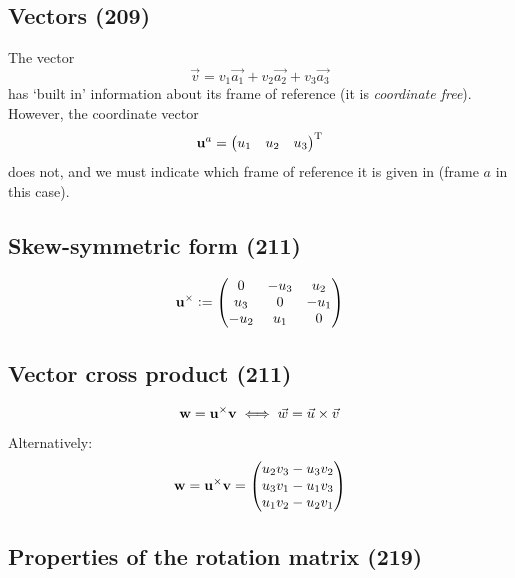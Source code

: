 \documentclass[a4paper, 12pt]{article}
\begin{document}
\subsection{Vectors (209)}
The vector
\begin{equation}
	\vec{v} = v_1 \vec{a_1} + v_2 \vec{a_2} + v_3 \vec{a_3}
\end{equation}
has `built in' information about its frame of reference (it is \emph{coordinate free}). However, the coordinate vector
\begin{equation}
	\mathbf{u}^a =
	\begin{pmatrix}
		u_1 & u_2 & u_3 \\
	\end{pmatrix}
	^{\text{T}}
\end{equation}
does not, and we must indicate which frame of reference it is given in (frame \(a\) in this case).

\subsection{Skew-symmetric form (211)}
\begin{equation}
	\mathbf{u}^\times :=
	\begin{pmatrix}
		0    & -u_3 & u_2  \\
		u_3  & 0    & -u_1 \\
		-u_2 & u_1  & 0    \\
	\end{pmatrix}
\end{equation}

\subsection{Vector cross product (211)}
\begin{equation}
	\mathbf{w} = \mathbf{u}^\times \mathbf{v}
	\iff
	\vec{w} = \vec{u} \times \vec{v}
\end{equation}
Alternatively:
\begin{equation}
	\mathbf{w} = \mathbf{u}^\times \mathbf{v} =
	\begin{pmatrix}
		u_2 v_3 - u_3 v_2 \\
		u_3 v_1 - u_1 v_3 \\
		u_1 v_2 - u_2 v_1 \\
	\end{pmatrix}
\end{equation}

\subsection{Properties of the rotation matrix (219)}
\end{document}
